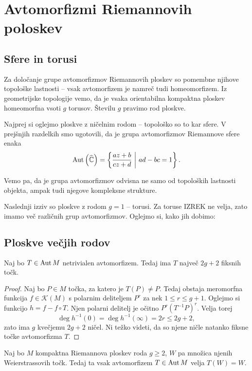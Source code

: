 \section{Avtomorfizmi Riemannovih poloskev}

\subsection{Sfere in torusi}

Za določanje grupe avtomorfizmov Riemannovih ploskev so pomembne
njihove topološke lastnosti -- vsak avtomorfizem je namreč tudi
homeomorfizem. Iz geometrijske topologije vemo, da je vsaka
orientabilna kompaktna ploskev homeomorfna vsoti $g$ torusov.
Številu $g$ pravimo rod ploskve.

Najprej si oglejmo ploskve z ničelnim rodom -- topološko so to kar
sfere. V prejšnjih razdelkih smo ugotovili, da je grupa
avtomorfizmov Riemannove sfere enaka
\[
\operatorname{Aut} \left(\widehat{\mathbb{C}}\right) = \left\{\frac{az + b}{cz + d}~\middle\vert~ad - bc = 1\right\}.
\]

Vemo pa, da je grupa avtomorfizmov odvisna ne samo od topoloških
lastnosti objekta, ampak tudi njegove kompleksne strukture.

Naslednji izziv so ploskve z rodom $g=1$ -- torusi. Za toruse
IZREK ne velja, zato imamo več različnih grup avtomorfizmov.
Oglejmo si, kako jih dobimo:

\subsection{Ploskve večjih rodov}

\begin{trditev}
Naj bo $T \in \operatorname{Aut} M$ netrivialen avtomorfizem. Tedaj ima $T$
največ $2g + 2$ fiksnih točk.
\end{trditev}

\begin{proof}
Naj bo $P \in M$ točka, za katero je $T(P) \ne P$. Tedaj obstaja
meromorfna funkcija $f \in \mathscr{K}(M)$ s polarnim deliteljem
$P^r$ za nek $1 \leq r \leq g + 1$. Oglejmo si funkcijo
$h = f - f \circ T$. Njen polarni delitelj je očitno
$P^r (T^{-1}P)^r$. Velja torej
\[
\deg h^{-1}(0) = \deg h^{-1}(\infty) = 2r \leq 2g + 2,
\]
zato ima $g$ kvečjemu $2g + 2$ ničel. Ni težko videti, da so njene
ničle natanko fiksne točke avtomorfizma $T$.
\end{proof}

\begin{lema}
Naj bo $M$ kompaktna Riemannova ploskev roda $g \geq 2$, $W$ pa
množica njenih Weierstrassovih točk. Tedaj ta vsak avtomorfizem
$T \in \operatorname{Aut} M$ velja $T(W) = W$.
\end{lema}


